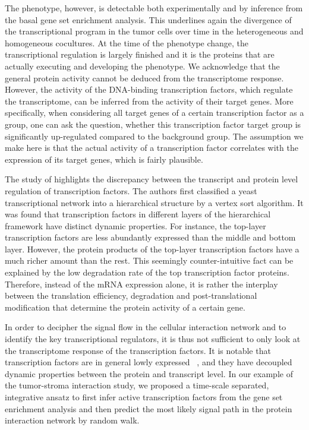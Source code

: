 The phenotype, however, is detectable both experimentally
and by inference from the basal gene set enrichment analysis.
This underlines again the divergence of the transcriptional
program in the tumor cells over time in the heterogeneous
and homogeneous cocultures. At the time of the phenotype
change, the transcriptional regulation is largely finished
and it is the proteins that are actually executing and
developing the phenotype. We acknowledge that the general 
protein
activity cannot be deduced from the transcriptome response.
However, the activity of the DNA-binding transcription
factors, which regulate the transcriptome, can be
inferred from the activity of their target genes.
More specifically, when considering all target genes of
a certain transcription factor as a group, one can ask
the question, whether this transcription factor target
group is significantly up-regulated compared to the
background group. The assumption we make here is that the actual
activity of a transcription factor correlates with 
the expression of its target genes, which is fairly
plausible.

The study of \cite{Jothi2009} highlights the discrepancy
between the transcript and protein level regulation of
transcription factors. The authors first classified a
yeast transcriptional network into a hierarchical
structure by a vertex sort algorithm. It was found that
transcription factors in different layers of the
hierarchical framework have distinct dynamic properties.
For instance, the top-layer transcription factors are
less abundantly expressed than the middle and bottom
layer. However, the protein products of the top-layer
transcription factors have a much richer amount than
the rest. This seemingly counter-intuitive fact can be explained by
the low degradation rate of the top transcription
factor proteins. Therefore, instead of the mRNA 
expression alone, it is rather the interplay between
the translation efficiency, degradation and 
post-translational modification that determine the
protein activity of a certain gene.

In order to decipher the signal flow in the cellular
interaction network and to identify the key 
transcriptional regulators, it is thus not sufficient
to only look at the transcriptome response of the
transcription factors. It is notable that transcription
factors are in general lowly expressed%
~\citep{Vaquerizas2009}, and they have decoupled
dynamic properties between the protein and transcript
level. 
In our example of the tumor-stroma interaction study, 
we proposed a time-scale separated,
integrative ansatz to first infer active 
transcription factors from the gene set enrichment 
analysis and then predict the most likely
signal path in the protein interaction network by 
random walk.

